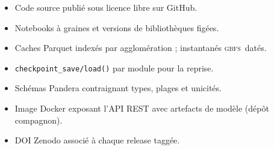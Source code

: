 \documentclass[11pt,a4paper]{article}
\newcommand{\GBFS}{\textsc{gbfs}\xspace}
\begin{document}
\begin{itemize}[leftmargin=*,itemsep=0.2em]
    \item Code source publié sous licence libre sur GitHub.
    \item Notebooks à graines et versions de bibliothèques
    figées.
    \item Caches Parquet indexés par agglomération ; instantanés
    \GBFS\ datés.
    \item \texttt{checkpoint\_save/load()} par module pour la
    reprise.
    \item Schémas Pandera \citep{Niels2020} contraignant types,
    plages et unicités.
    \item Image Docker exposant l'API REST avec artefacts de
    modèle (dépôt compagnon).
    \item DOI Zenodo associé à chaque release taggée.
\end{itemize}
\end{document}
